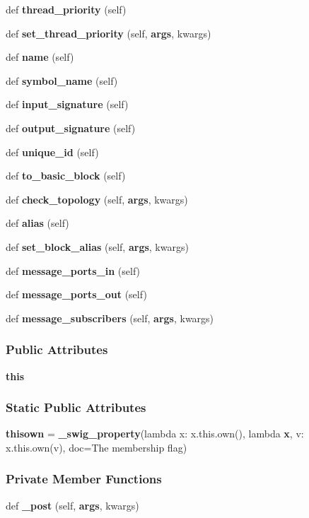 \begin{DoxyCompactItemize}
def {\bf thread\+\_\+priority} (self)
\item 
def {\bf set\+\_\+thread\+\_\+priority} (self, {\bf args}, kwargs)
\item 
def {\bf name} (self)
\item 
def {\bf symbol\+\_\+name} (self)
\item 
def {\bf input\+\_\+signature} (self)
\item 
def {\bf output\+\_\+signature} (self)
\item 
def {\bf unique\+\_\+id} (self)
\item 
def {\bf to\+\_\+basic\+\_\+block} (self)
\item 
def {\bf check\+\_\+topology} (self, {\bf args}, kwargs)
\item 
def {\bf alias} (self)
\item 
def {\bf set\+\_\+block\+\_\+alias} (self, {\bf args}, kwargs)
\item 
def {\bf message\+\_\+ports\+\_\+in} (self)
\item 
def {\bf message\+\_\+ports\+\_\+out} (self)
\item 
def {\bf message\+\_\+subscribers} (self, {\bf args}, kwargs)
\end{DoxyCompactItemize}
\subsubsection*{Public Attributes}
\begin{DoxyCompactItemize}
\item 
{\bf this}
\end{DoxyCompactItemize}
\subsubsection*{Static Public Attributes}
\begin{DoxyCompactItemize}
\item 
{\bf thisown} = {\bf \+\_\+swig\+\_\+property}(lambda x\+: x.\+this.\+own(), lambda {\bf x}, v\+: x.\+this.\+own(v), doc=\textquotesingle{}The membership flag\textquotesingle{})
\end{DoxyCompactItemize}
\subsubsection*{Private Member Functions}
\begin{DoxyCompactItemize}
\item 
def {\bf \+\_\+post} (self, {\bf args}, kwargs)
\end{DoxyCompactItemize}
